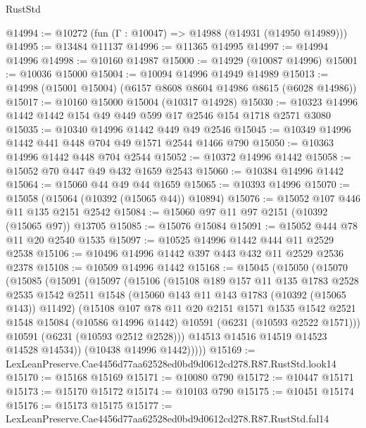 \begin{lexlean}{RustStd}
\begin{coremodule}
{{@14994 := @10272 (fun (Γ : @10047) => @14988 (@14931 (@14950 @14989)))
@14995 := @13484 @11137
@14996 := @11365 @14995
@14997 := @14994 @14996
@14998 := @10160 @14987
@15000 := @14929 (@10087 @14996)
@15001 := @10036 @15000
@15004 := @10094 @14996 @14949 @14989
@15013 := @14998 (@15001 @15004) (@6157 @8608 @8604 @14986 @8615 (@6028 @14986))
@15017 := @10160 @15000 @15004 (@10317 @14928)
@15030 := @10323 @14996 @1442 @1442 @154 @49 @449 @599 @17 @2546 @154 @1718 @2571 @3080
@15035 := @10340 @14996 @1442 @449 @49 @2546
@15045 := @10349 @14996 @1442 @441 @448 @704 @49 @1571 @2544 @1466 @790
@15050 := @10363 @14996 @1442 @448 @704 @2544
@15052 := @10372 @14996 @1442
@15058 := @15052 @70 @447 @49 @432 @1659 @2543
@15060 := @10384 @14996 @1442
@15064 := @15060 @44 @49 @44 @1659
@15065 := @10393 @14996
@15070 := @15058 (@15064 (@10392 (@15065 @44)) @10894)
@15076 := @15052 @107 @446 @11 @135 @2151 @2542
@15084 := @15060 @97 @11 @97 @2151 (@10392 (@15065 @97)) @13705
@15085 := @15076 @15084
@15091 := @15052 @444 @78 @11 @20 @2540 @1535
@15097 := @10525 @14996 @1442 @444 @11 @2529 @2538
@15106 := @10496 @14996 @1442 @397 @443 @432 @11 @2529 @2536 @2378
@15108 := @10509 @14996 @1442
@15168 := @15045
    (@15050
      (@15070
        (@15085
          (@15091
            (@15097
              (@15106
                (@15108
                  @189
                  @157
                  @11
                  @135
                  @1783
                  @2528
                  @2535
                  @1542
                  @2511
                  @1548
                  (@15060 @143 @11 @143 @1783 (@10392 (@15065 @143)) @11492)
                  (@15108
                    @107
                    @78
                    @11
                    @20
                    @2151
                    @1571
                    @1535
                    @1542
                    @2521
                    @1548
                    @15084
                    (@10586 @14996 @1442)
                    @10591
                    (@6231 (@10593 @2522 @1571)))
                  @10591
                  (@6231 (@10593 @2512 @2528)))
                @14513
                @14516
                @14519
                @14523
                @14528
                @14534))
            (@10438 @14996 @1442)))))
@15169 := LexLeanPreserve.Cae4456d77aa62528ed0bd9d0612cd278.R87.RustStd.look14
@15170 := @15168 @15169
@15171 := @10080 @790
@15172 := @10447 @15171
@15173 := @15170 @15172
@15174 := @10103 @790
@15175 := @10451 @15174
@15176 := @15173 @15175
@15177 := LexLeanPreserve.Cae4456d77aa62528ed0bd9d0612cd278.R87.RustStd.fal14
}}
\end{coremodule}
\end{lexlean}
